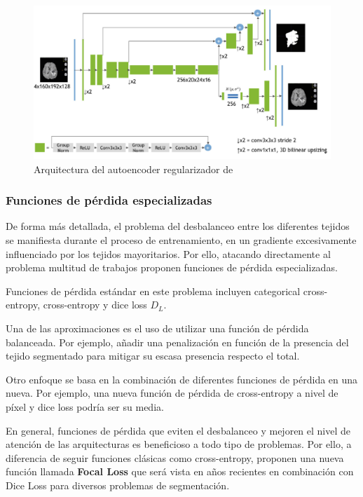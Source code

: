 			\begin{figure}[H]
				\centering
				\includegraphics[width=1.0\linewidth]{imagenes/myroenko2019.png}
				\caption{Arquitectura del autoencoder regularizador de \cite{myronenko20193d}}
			\end{figure}
			
				
			\subsubsection{Funciones de pérdida especializadas}
			
			De forma más detallada, el problema del desbalanceo entre los diferentes tejidos se manifiesta durante el proceso de entrenamiento, en un gradiente excesivamente influenciado por los tejidos mayoritarios. Por ello, atacando directamente al problema multitud de trabajos proponen funciones de pérdida especializadas.
			
			Funciones de pérdida estándar en este problema incluyen categorical cross-entropy, cross-entropy y dice loss $D_{L}$.
			
			Una de las aproximaciones es el uso de utilizar una función de pérdida balanceada. Por ejemplo, añadir una penalización en función de la presencia del tejido segmentado para mitigar su escasa presencia respecto el total.
			
			Otro enfoque se basa en la combinación de diferentes funciones de pérdida en una nueva. Por ejemplo, una nueva función de pérdida de cross-entropy a nivel de píxel y dice loss podría ser su media.
			
			En general, funciones de pérdida que eviten el desbalanceo y mejoren el nivel de atención de las arquitecturas es beneficioso a todo tipo de problemas. Por ello, a diferencia de seguir funciones clásicas como cross-entropy, \cite{lin2017focal} proponen una nueva función llamada \textbf{Focal Loss} que será vista en años recientes en combinación con Dice Loss para diversos problemas de segmentación.
			
